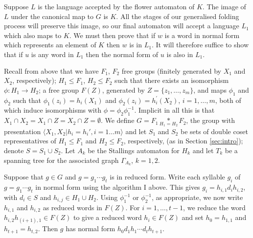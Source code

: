\documentclass[a4paper,12pt]{article}
\newcommand{\G}{\Gamma }
\newcommand{\nul}{\emptyset }
\numberwithin{equation}{section}
\numberwithin{figure}{section}
\newcommand{\la}{\langle}
\newcommand{\ra}{\rangle}
\begin{document}
 Suppose $L$ is the
language accepted by the flower automaton of $K$. The image of $L$ under
the canonical map to $G$ is $K$. All the stages of our generalised folding
process will preserve this image, so our final automaton will accept a language
$L_1$ which also maps to $K$. We must then prove that if $w$ is a word
in normal form which represents an element of $K$ then $w$ is in $L_1$. It will
therefore suffice to show that if $u$ is any word in $L_1$ then the
normal form of $u$ is also in $L_1$.

Recall from above that we have $F_1$, $F_2$ free groups (finitely
generated by $X_1$ and $X_2$, respectively);
 $H_1 \leq F_1$, $H_2 \leq F_2$ such that
there exists an isomorphism $\phi: H_1 \rightarrow H_2$; a free group
 $F(Z)$, generated by $Z=\{z_1, \ldots, z_m\}$,
and  maps $\phi_1$ and $\phi_2$ such that $\phi_1(z_i)=h_i(X_1)  $
and  $\phi_2(z_i)=h^\prime_i(X_2)$, $i=1,\ldots ,m$, both of which
induce isomorphisms with $\phi=\phi_2\phi_1^{-1}$. Implicit in all
this is that $X_1\cap X_2=X_1\cap Z = X_2\cap Z=\nul$. We define
${G = F_1 \underset{H_1=H_2}{\ast} F_2}$, the group with
 presentation $\la X_1,X_2 | h_i = h_i', i=1 \ldots m\ra$ and
let $S_1$ and $S_2$ be sets of  double coset representatives of
$H_1\le F_1$ and $H_2\le F_2$, respectively, (as in Section
\ref{sec:intro}); denote $S= S_1 \cup S_2$. Let $A_k$ be the
Stallings automaton for $H_k$ and let $T_k$ be a spanning tree for
the associated graph $\G_{A_k}$, $k=1,2$.

Suppose that $g \in G$ and $g=g_1\cdots g_t$ is in reduced form.
Write each syllable $g_i$ of $g=g_1\cdots g_t$ in normal form
using the algorithm I above. This gives
$g_i=h_{i,1}d_ih_{i,2}$, with $d_i\in S$ and $h_{i,j}\in H_1\cup
H_2$. Using $\phi_1^{-1}$ or $\phi_2^{-1}$, as appropriate, we now
write $h_{i,1}$ and $h_{i,2}$ as reduced words in $F(Z)$. For
$i=1,\ldots , t-1$, we reduce the word $h_{i,2}h_{(i+1),1}\in
F(Z)$ to give a reduced word $h_i\in F(Z)$ and set $h_0=h_{1,1}$
and  $h_{t+1}=h_{t,2}$. Then $g$ has normal form $h_0d_1h_1\cdots
d_th_{t+1}$.
\end{document}
